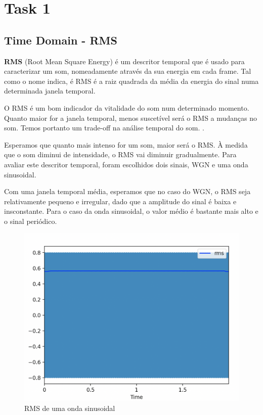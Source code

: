 \section{Task 1} \label{ex_1}

\subsection{Time Domain - RMS}

\textbf{RMS} (Root Mean Square Energy) é um descritor temporal que é usado para caracterizar um som, nomeadamente através da sua energia em cada frame.
Tal como o nome indica, é RMS é a raiz quadrada da média da energia do sinal numa determinada janela temporal. 

O RMS é um bom indicador da vitalidade do som num determinado momento. Quanto maior for a janela temporal, menos suscetível será o RMS a mudanças no som.
Temos portanto um trade-off na análise temporal do som. \cite{rms}.

Esperamos que quanto mais intenso for um som, maior será o RMS. À medida que o som diminui de intensidade, o RMS vai diminuir gradualmente.
Para avaliar este descritor temporal, foram escolhidos dois sinais, WGN e uma onda sinusoidal.

Com uma janela temporal média, esperamos que no caso do WGN, o RMS seja relativamente pequeno e irregular, dado que a amplitude do sinal é baixa e insconstante.
Para o caso da onda sinusoidal, o valor médio é bastante mais alto e o sinal periódico.

\begin{figure}[H]
    \centering
    \includegraphics[width=.8\linewidth]{figs/image_1.png}
    \caption{RMS de uma onda sinusoidal}
    \label{fig:rms_1}
\end{figure}

